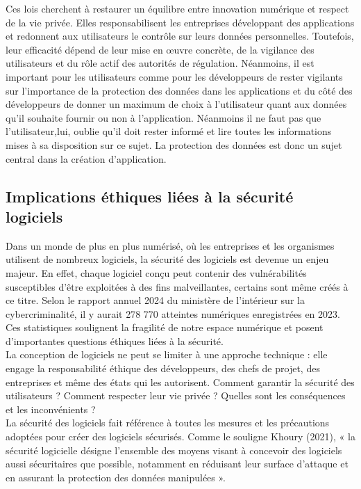 \documentclass{article}
\begin{document}
Ces lois cherchent à restaurer un équilibre entre innovation numérique et respect de la vie privée. Elles responsabilisent les entreprises développant des applications et redonnent aux utilisateurs le contrôle sur leurs données personnelles. Toutefois, leur efficacité dépend de leur mise en œuvre concrète, de la vigilance des utilisateurs et du rôle actif des autorités de régulation. Néanmoins, il est important pour les utilisateurs comme pour les développeurs de rester vigilants sur l'importance de la protection des données dans les applications et du côté des développeurs de donner un maximum de choix à l’utilisateur quant aux données qu'il souhaite fournir ou non à l'application. Néanmoins il ne faut pas que l'utilisateur,lui, oublie qu'il doit rester informé et lire toutes les informations mises à sa disposition sur ce sujet. La protection des données est donc un sujet central dans la création d'application.

\subsection{Implications éthiques liées à la sécurité  logiciels}
Dans un monde de plus en plus numérisé, où les entreprises et les organismes utilisent de
nombreux logiciels, la sécurité des logiciels est devenue un enjeu majeur. En effet, chaque
logiciel conçu peut contenir des vulnérabilités susceptibles d’être exploitées à des fins
malveillantes, certains sont même créés à ce titre. Selon le rapport annuel 2024 du ministère de
l’intérieur sur la cybercriminalité, il y aurait
278 770 atteintes numériques enregistrées en
2023. Ces statistiques soulignent la fragilité de notre espace numérique et posent
d'importantes questions éthiques liées à la sécurité.\\

La conception de logiciels ne peut se limiter à une approche technique : elle engage la
responsabilité éthique des développeurs, des chefs de projet, des entreprises et même des
états qui les autorisent. Comment garantir la sécurité des utilisateurs ? Comment respecter leur
vie privée ? Quelles sont les conséquences et les inconvénients ?\\

La sécurité des logiciels fait référence à toutes les mesures et les précautions adoptées pour
créer des logiciels sécurisés. Comme le souligne Khoury (2021),
« la sécurité logicielle désigne
l’ensemble des moyens visant à concevoir des logiciels aussi sécuritaires que possible,
notamment en réduisant leur surface d’attaque et en assurant la protection des données
manipulées ».\\
\end{document}
